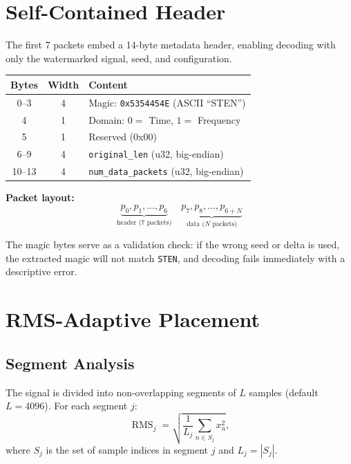 \documentclass[11pt,a4paper]{article}
\DeclareMathOperator{\rms}{RMS}
\begin{document}
\section{Self-Contained Header}
\label{sec:header}

The first 7 packets embed a 14-byte metadata header, enabling decoding
with only the watermarked signal, seed, and configuration.

\begin{center}
\begin{tabular}{@{}ccl@{}}
\toprule
Bytes & Width & Content \\
\midrule
0--3 & 4 & Magic: \texttt{0x5354454E} (ASCII ``STEN'') \\
4    & 1 & Domain: $0 =$ Time, $1 =$ Frequency \\
5    & 1 & Reserved (0x00) \\
6--9 & 4 & \texttt{original\_len} (u32, big-endian) \\
10--13 & 4 & \texttt{num\_data\_packets} (u32, big-endian) \\
\bottomrule
\end{tabular}
\end{center}

\textbf{Packet layout:}
\[
    \underbrace{p_0, p_1, \ldots, p_6}_{\text{header (7 packets)}} \quad
    \underbrace{p_7, p_8, \ldots, p_{6+N}}_{\text{data ($N$ packets)}}
\]

The magic bytes serve as a validation check: if the wrong seed or delta
is used, the extracted magic will not match \texttt{STEN}, and decoding
fails immediately with a descriptive error.


\section{RMS-Adaptive Placement}
\label{sec:rms}

\subsection{Segment Analysis}

The signal is divided into non-overlapping segments of $L$ samples
(default $L = 4096$).  For each segment $j$:
\[
    \rms_j = \sqrt{\frac{1}{L_j} \sum_{n \in S_j} x_n^2},
\]
where $S_j$ is the set of sample indices in segment $j$ and $L_j = |S_j|$.
\end{document}
